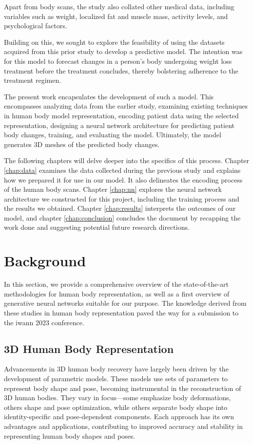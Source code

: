 Apart from body scans, the study also collated other medical data, including
variables such as weight, localized fat and muscle mass, activity levels, and
psychological factors.

Building on this, we sought to explore the feasibility of using the datasets
acquired from this prior study to develop a predictive model. The intention was
for this model to forecast changes in a person's body undergoing weight loss
treatment before the treatment concludes, thereby bolstering adherence to the
treatment regimen.

The present work encapsulates the development of such a model. This encompasses
analyzing data from the earlier study, examining existing techniques in human
body model representation, encoding patient data using the selected
representation, designing a neural network architecture for predicting patient
body changes, training, and evaluating the model. Ultimately, the model
generates 3D meshes of the predicted body changes.

The following chapters will delve deeper into the specifics of this process.
Chapter \ref{chap:data} examines the data collected during the previous study
and explains how we prepared it for use in our model. It also delineates the
encoding process of the human body scans. Chapter \ref{chap:nn} explores the
neural network architecture we constructed for this project, including the
training process and the results we obtained. Chapter \ref{chap:results}
interprets the outcomes of our model, and chapter \ref{chap:conclusion}
concludes the document by recapping the work done and suggesting potential
future research directions.

\section{Background}

In this section, we provide a comprehensive overview of the state-of-the-art
methodologies for human body representation, as well as a first overview of
generative neural networks suitable for our purpose. The knowledge derived from
these studies in human body representation paved the way for a submission to
the \gls{iwann} 2023 conference. 

\subsection{3D Human Body Representation}

Advancements in 3D human body recovery have largely been driven by the
development of parametric models. These models use sets of parameters to
represent body shape and pose, becoming instrumental in the reconstruction of
3D human bodies. They vary in focus—some emphasize body deformations, others
shape and pose optimization, while others separate body shape into
identity-specific and pose-dependent components. Each approach has its own
advantages and applications, contributing to improved accuracy and stability in
representing human body shapes and poses.

